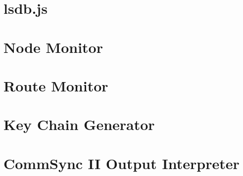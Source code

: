 \documentclass[12pt]{article}
\begin{document}
\section{lsdb.js}

\section{Node Monitor}

\section{Route Monitor}

\section{Key Chain Generator}

\section{CommSync II Output Interpreter}
\end{document}
